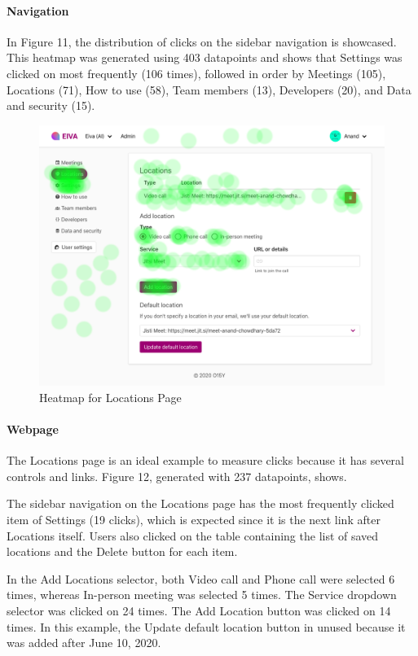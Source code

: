 \documentclass{article}
\begin{document}
\paragraph{Navigation}

In Figure 11, the distribution of clicks on the sidebar navigation is showcased. This heatmap was generated using 403 datapoints and shows that Settings was clicked on most frequently (106 times), followed in order by Meetings (105), Locations (71), How to use (58), Team members (13), Developers (20), and Data and security (15).

\begin{figure}
  \includegraphics[width=\textwidth]{heatmap-locations.png}
  \caption{Heatmap for Locations Page}
\end{figure}

\paragraph{Webpage}

The Locations page is an ideal example to measure clicks because it has several controls and links. Figure 12, generated with 237 datapoints, shows.

The sidebar navigation on the Locations page has the most frequently clicked item of Settings (19 clicks), which is expected since it is the next link after Locations itself. Users also clicked on the table containing the list of saved locations and the Delete button for each item.

In the Add Locations selector, both Video call and Phone call were selected 6 times, whereas In-person meeting was selected 5 times. The Service dropdown selector was clicked on 24 times. The Add Location button was clicked on 14 times. In this example, the Update default location button in unused because it was added after June 10, 2020.
\end{document}

